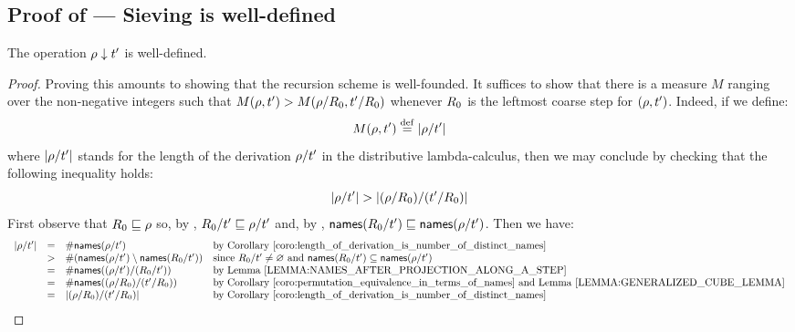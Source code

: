 
\subsection*{Proof of  --- Sieving is well-defined}
\label{sieving_is_well_defined_proof}
The operation $\rho \downarrow t'$ is well-defined.
\begin{proof}
Proving this amounts to showing that the recursion scheme is well-founded.
It suffices to show that there is a measure $M$ ranging over the non-negative
integers such that
$M(\rho,t') > M(\rho/R_0,t'/R_0)$
whenever $R_0$ is the leftmost coarse step for $(\rho,t')$.
Indeed, if we define:
\[
  M(\rho,t') \overset{\mathrm{def}}{=} |\rho/t'|
\]
where $|\rho/t'|$ stands for the length of the derivation $\rho/t'$
in the distributive lambda-calculus, then we may conclude by checking that the following inequality holds:
\[
  |\rho/t'| > |(\rho/R_0)/(t'/R_0)|
\]
First observe that
$R_0 \sqsubseteq \rho$
so, by ,
$R_0/t' \sqsubseteq \rho/t'$
and, by ,
$\mathsf{names}(R_0/t') \sqsubseteq \mathsf{names}(\rho/t')$.
Then we have:
\[
  \begin{array}{rcll}
  \lengthof{\redseq/\tm'}
   & = & \#\names(\redseq/\tm') & \text{by \rcoro{length_of_derivation_is_number_of_distinct_names}} \\
   & > & \#(\names(\redseq/\tm') \setminus \names(\redex_0/\tm')) & \text{since $\redex_0/\tm' \neq \emptyset$ and $\names(\redex_0/\tm') \subseteq \names(\redseq/\tm')$} \\
   & = & \#\names((\redseq/\tm') / (\redex_0/\tm')) & \text{by \rlem{names_after_projection_along_a_step}} \\
   & = & \#\names((\redseq/\redex_0) / (\tm'/\redex_0)) & \text{by \rcoro{permutation_equivalence_in_terms_of_names} and \rlem{generalized_cube_lemma}} \\
   & = & \lengthof{(\redseq/\redex_0) / (\tm'/\redex_0)} & \text{by \rcoro{length_of_derivation_is_number_of_distinct_names}}
  \end{array}
\]
\end{proof}

